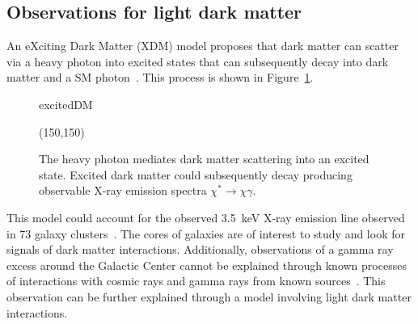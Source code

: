 \subsection{Observations for light dark matter}
An eXciting Dark Matter (XDM) model proposes that dark matter can scatter via a heavy photon into excited states that can subsequently decay into  dark matter and a SM photon~\cite{finkbeiner_x-ray_2014}. This process is shown in Figure~\ref{fig:excitation}.

\begin{figure}[htb]
    \begin{center}
	\begin{fmffile}{excitedDM}
	\begin{fmfgraph*}(150,150)
\end{fmfgraph*}
	\end{fmffile}
  	\end{center}
    	\caption[Heavy photon mediates dark matter scattering into an excited state]{The heavy photon mediates dark matter scattering into an excited state. Excited dark matter could subsequently decay producing observable X-ray emission spectra $\chi^{\ast}\rightarrow\chi\gamma$.}
   	 \label{fig:excitation}	
\end{figure}

This model could account for the observed 3.5~keV X-ray emission line observed in 73 galaxy clusters~\cite{bulbul_detection_2014}. The cores of galaxies are of interest to study and look for signals of dark matter interactions.  Additionally, observations of a gamma ray excess around the Galactic Center cannot be explained through known processes of interactions with cosmic rays and gamma rays from known sources~\cite{Hooper:2010mq}. This observation can be further explained through a model involving light dark matter interactions. 

